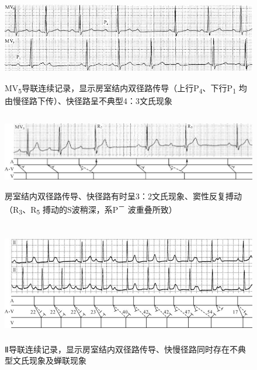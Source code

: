 \begin{figure}[!htbp]
 \centering
 \includegraphics[width=5.58333in,height=1.48958in]{./images/Image00420.jpg}
 \captionsetup{justification=centering}
 \caption{MV\textsubscript{5}导联连续记录，显示房室结内双径路传导（上行P\textsubscript{4}、下行P\textsubscript{1} 均由慢径路下传）、快径路呈不典型4：3文氏现象}
 \label{fig25-9}
  \end{figure} 


\begin{figure}[!htbp]
 \centering
 \includegraphics[width=5.78125in,height=1.30208in]{./images/Image00421.jpg}
 \captionsetup{justification=centering}
 \caption{房室结内双径路传导、快径路有时呈3：2文氏现象、窦性反复搏动（R\textsubscript{3}、R\textsubscript{5} 搏动的S波稍深，系P\textsuperscript{－} 波重叠所致）}
 \label{fig25-10}
  \end{figure} 


\begin{figure}[!htbp]
 \centering
 \includegraphics[width=5.72917in,height=2.0625in]{./images/Image00422.jpg}
 \captionsetup{justification=centering}
 \caption{Ⅱ导联连续记录，显示房室结内双径路传导、快慢径路同时存在不典型文氏现象及蝉联现象}
 \label{fig25-11}
  \end{figure} 

